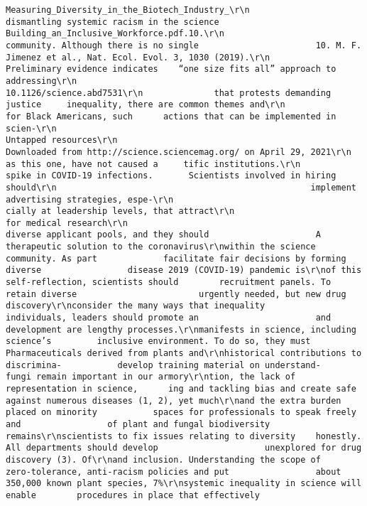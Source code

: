 \documentclass[
]{book}
\begin{document}
\begin{verbatim}
Measuring_Diversity_in_the_Biotech_Industry_\r\n                                                  dismantling systemic racism in the science                       Building_an_Inclusive_Workforce.pdf.10.\r\n                                                  community. Although there is no single                       10. M. F. Jimenez et al., Nat. Ecol. Evol. 3, 1030 (2019).\r\n                Preliminary evidence indicates    “one size fits all” approach to addressing\r\n                                                                                                                                              10.1126/science.abd7531\r\n              that protests demanding justice     inequality, there are common themes and\r\n                   for Black Americans, such      actions that can be implemented in scien-\r\n                                                                                                               Untapped resources\r\n                                                                                                                                                                               Downloaded from http://science.sciencemag.org/ on April 29, 2021\r\n               as this one, have not caused a     tific institutions.\r\n                 spike in COVID-19 infections.       Scientists involved in hiring should\r\n                                                  implement advertising strategies, espe-\r\n                                                  cially at leadership levels, that attract\r\n                                                                                                               for medical research\r\n                                                  diverse applicant pools, and they should                     A therapeutic solution to the coronavirus\r\nwithin the science community. As part             facilitate fair decisions by forming diverse                 disease 2019 (COVID-19) pandemic is\r\nof this self-reflection, scientists should        recruitment panels. To retain diverse                        urgently needed, but new drug discovery\r\nconsider the many ways that inequality            individuals, leaders should promote an                       and development are lengthy processes.\r\nmanifests in science, including science’s         inclusive environment. To do so, they must                   Pharmaceuticals derived from plants and\r\nhistorical contributions to discrimina-           develop training material on understand-                     fungi remain important in our armory\r\ntion, the lack of representation in science,      ing and tackling bias and create safe                        against numerous diseases (1, 2), yet much\r\nand the extra burden placed on minority           spaces for professionals to speak freely and                 of plant and fungal biodiversity remains\r\nscientists to fix issues relating to diversity    honestly. All departments should develop                     unexplored for drug discovery (3). Of\r\nand inclusion. Understanding the scope of         zero-tolerance, anti-racism policies and put                 about 350,000 known plant species, 7%\r\nsystemic inequality in science will enable        procedures in place that effectively 
\end{verbatim}
\end{document}
